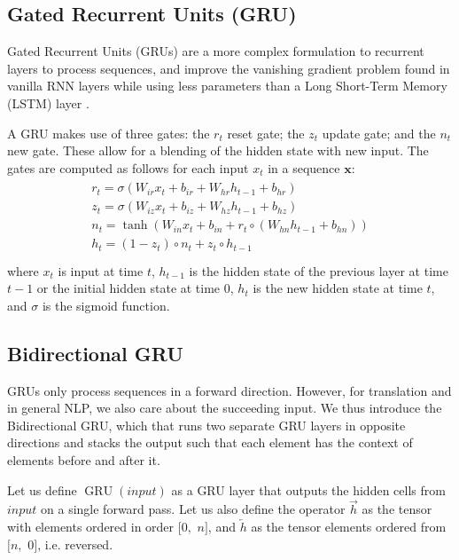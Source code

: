 \documentclass[twoside,twocolumn]{article}
\renewcommand{\vec}[1]{\mathbf{#1}}
\begin{document}
\subsection{Gated Recurrent Units (GRU)}
\label{sec:gru}

Gated Recurrent Units (GRUs) are a more complex formulation to recurrent layers
to process sequences, and improve the vanishing gradient problem found in
vanilla RNN layers while using less parameters than a Long Short-Term Memory
(LSTM) layer \cite{cho2014learning}.

A GRU makes use of three gates: the $r_t$  reset gate; the $z_t$ update gate;
and the $n_t$ new gate. These allow for a blending of the hidden state with new input. The gates are computed as follows for each input $x_t$ in a sequence
$\vec{x}$:
\begin{equation}
  \begin{split}\begin{array}{ll}
  r_t = \sigma(W_{ir} x_t + b_{ir} + W_{hr} h_{t-1} + b_{hr}) \\
  z_t = \sigma(W_{iz} x_t + b_{iz} + W_{hz} h_{t-1} + b_{hz}) \\
  n_t = \tanh(W_{in} x_t + b_{in} + r_t \circ (W_{hn} h_{t-1}+ b_{hn})) \\
  h_t = (1 - z_t) \circ n_t + z_t \circ h_{t-1} \\
  \end{array}\end{split}
\end{equation}
where $x_t$ is input at time $t$, $h_{t-1}$ is the hidden state of the
previous layer at time $t-1$ or the initial hidden state at time $0$, $h_t$
is the new hidden state at time $t$, and $\sigma$ is the sigmoid function.

\subsection{Bidirectional GRU}
\label{sec:bidirectional}

GRUs only process sequences in a forward direction. However, for
translation and in general NLP, we also care about the succeeding input.
We thus introduce the Bidirectional GRU, which that runs two separate GRU
layers in opposite directions and stacks the output such that each element has
the context of elements before and after it.

Let us define $\operatorname{GRU}(input)$ as a GRU layer that outputs the
hidden cells from $input$ on a single forward pass. Let us also define the
operator $\overrightarrow{h}$ as the tensor with elements ordered in
order $[0,$ $n]$, and $\overleftarrow{h}$ as the tensor elements ordered
from $[n,$ $0]$, i.e. reversed.
\end{document}
